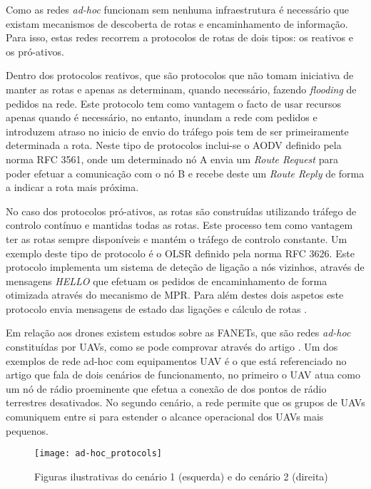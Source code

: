 Como as redes \textit{ad-hoc} funcionam sem nenhuma infraestrutura é necessário que existam mecanismos de descoberta de rotas e encaminhamento de informação. Para isso, estas redes recorrem a protocolos de rotas de dois tipos: os reativos e os pró-ativos.

Dentro dos protocolos reativos, que são protocolos que não tomam iniciativa de manter as rotas e apenas as determinam, quando necessário, fazendo \textit{flooding} de pedidos na rede. Este protocolo tem como vantagem o facto de usar recursos apenas quando é necessário, no entanto, inundam a rede com pedidos e introduzem atraso no inicio de envio do tráfego pois tem de ser primeiramente determinada a rota. Neste tipo de protocolos inclui-se o AODV definido pela norma RFC 3561, onde um determinado nó A envia um \textit{Route Request} para poder efetuar a comunicação com o nó B e recebe deste um \textit{Route Reply} de forma a indicar a rota mais próxima.

No caso dos protocolos pró-ativos, as rotas são construídas utilizando tráfego de controlo contínuo e mantidas todas as rotas. Este processo tem como vantagem ter as rotas sempre disponíveis e mantém o tráfego de controlo constante. Um exemplo deste tipo de protocolo é o OLSR definido pela norma RFC 3626. Este protocolo implementa um sistema de deteção de ligação a nós vizinhos, através de mensagens \textit{HELLO} que efetuam os pedidos de encaminhamento de forma otimizada através do mecanismo de MPR. Para além destes dois aspetos este protocolo envia mensagens de estado das ligações e cálculo de rotas \cite{Ricardoa}.

Em relação aos drones existem estudos sobre as FANETs, que são redes \textit{ad-hoc} constituídas por UAVs, como se pode comprovar através do artigo \cite{Bekmezci2013a}. Um dos exemplos de rede ad-hoc com equipamentos UAV é o que está referenciado no artigo \cite{Brown2004} que fala de dois cenários de funcionamento, no primeiro o UAV atua como um nó de rádio proeminente que efetua a conexão de dos pontos de rádio terrestres desativados. No segundo cenário, a rede permite que os grupos de UAVs comuniquem entre si para estender o alcance operacional dos UAVs mais pequenos.

\begin{figure}[H]
\centering
\texttt{[image: ad-hoc\_protocols]}
\caption{Figuras ilustrativas do cenário 1 (esquerda) e do cenário 2 (direita)  \label{fig:ad-hoc_protocols}}
\cite{Ricardoa}
\end{figure}


